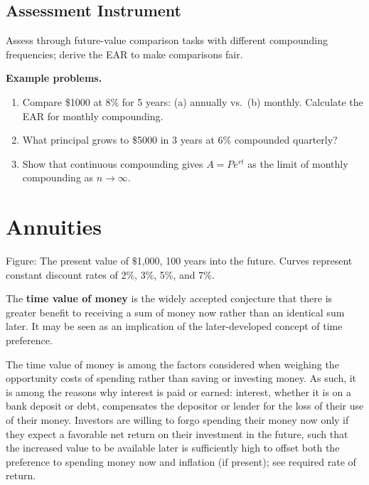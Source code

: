 \subsection{Assessment Instrument}
\label{ssec:asse-3669}


Assess through future-value comparison tasks with different compounding
frequencies; derive the EAR to make comparisons fair.

\textbf{Example problems.}
\begin{enumerate}
    \item Compare \$1000 at 8\% for 5 years: (a) annually vs.\
          (b) monthly. Calculate the EAR for monthly compounding.
    \item What principal grows to \$5000 in 3 years at 6\% compounded
          quarterly?
    \item Show that continuous compounding gives $A=Pe^{rt}$ as the limit
          of monthly compounding as $n\to\infty$.
\end{enumerate}



\section{Annuities}
\label{sec:annu-334a}





Figure: The present value of $\text{\$}$1,000, 100 years into the future. Curves represent
constant discount rates of 2\%, 3\%, 5\%, and 7\%.



The \textbf{time value of money} is the widely accepted conjecture that there is greater
benefit to receiving a sum of money now rather than an identical sum later. It may be seen
as an implication of the later-developed concept of time preference.



The time value of money is among the factors considered when weighing the opportunity
costs of spending rather than saving or investing money. As such, it is among the reasons
why interest is paid or earned: interest, whether it is on a bank deposit or debt,
compensates the depositor or lender for the loss of their use of their money. Investors
are willing to forgo spending their money now only if they expect a favorable net return
on their investment in the future, such that the increased value to be available later is
sufficiently high to offset both the preference to spending money now and inflation (if
present); see required rate of return.




